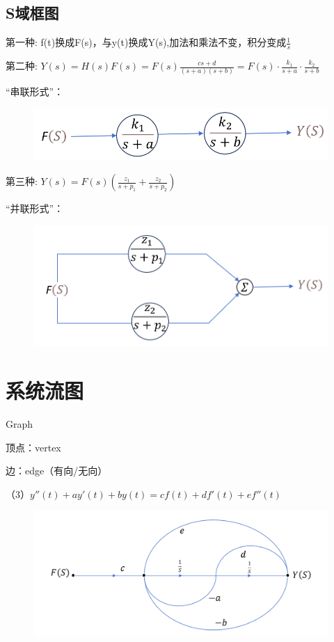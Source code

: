 \documentclass[UTF8]{ctexart}
\begin{document}
\subsection{S域框图}
第一种: f(t)换成F(s)，与y(t)换成Y(s),加法和乘法不变，积分变成$\boxed{\text{$\frac{1}{s}  $}}$ \par
第二种: $Y(s)=H(s)F(s)=F(s)\frac{cs+d}{(s+a)(s+b)}=F(s)\cdot \frac{k_1}{s+a} \cdot \frac{k_2}{s+b} $ \par
“串联形式”：\par
\begin{figure}[h]
    \raggedright   %
    \hspace{2em}   %
    \includegraphics[scale=0.25]{5.png}
\end{figure}
第三种: $Y(s)=F(s)(\frac{z_1}{s+p_1} +\frac{z_2}{s+p_2} )$ \par
“并联形式”：
\begin{figure}[h]
    \raggedright   %
    \hspace{2em}   %
    \includegraphics[scale=0.25]{6.png}
\end{figure}

\section{系统流图}
Graph \par
顶点：vertex \par
边：edge（有向/无向） \par
（3）$y''(t) + ay'(t) + by(t) = cf(t)+df'(t)+ef''(t)$ \par
\begin{figure}[h]
    \centering         %
    \includegraphics[scale=0.5]{7.png}
\end{figure}
\end{document}
